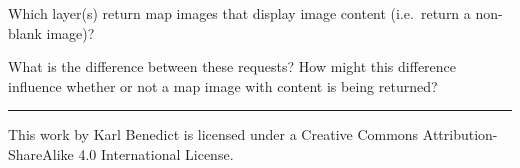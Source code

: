\documentclass[]{book}
\providecommand{\tightlist}{%
  \setlength{\itemsep}{0pt}\setlength{\parskip}{0pt}}
\begin{document}
\begin{description}
\tightlist
\item[Question 6]
Which layer(s) return map images that display image content (i.e.~return
a non-blank image)?
\item[Questions 7]
What is the difference between these requests? How might this difference
influence whether or not a map image with content is being returned?
\end{description}

\begin{center}\rule{0.5\linewidth}{\linethickness}\end{center}

This work by {Karl Benedict} is licensed under a Creative Commons
Attribution-ShareAlike 4.0 International License.
\end{document}
